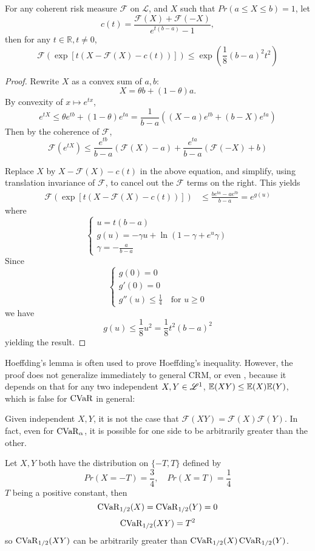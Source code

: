 \begin{prop}
For any coherent risk measure $\mathcal{F}$ on $\mathscr{L}$, and $X$ such that $Pr(a\le X \le b) = 1$, let 
$$c(t) = \frac{\mathcal{F}(X) + \mathcal{F}(-X)}{e^{t(b-a)} - 1},$$
then for any $t\in\mathbb{R}, t\neq 0$,
\begin{equation}
\label{eq:hoeffding_lemma}
\mathcal{F}(\exp{[t(X - \mathcal{F}(X) - c(t))]}) \le \exp\left(\frac 1 8 (b-a)^2 t^2\right)
\end{equation}
\end{prop}
\begin{proof}
Rewrite $X$ as a convex sum of $a, b$:
$$X = \theta b + (1-\theta) a.$$
By convexity of $x\mapsto e^{tx}$, 
$$e^{tX} \le \theta e^{tb} + (1-\theta)e^{ta} = \frac{1}{b-a}((X-a)e^{tb} + (b-X)e^{ta})$$
Then by the coherence of $\mathcal{F}$, 
$$\mathcal{F}(e^{tX}) \le \frac{e^{tb}}{b-a}(\mathcal{F}(X) -a ) + \frac{e^{ta}}{b-a}(\mathcal{F}(-X) + b)$$

Replace $X$ by $X - \mathcal{F}(X) - c(t)$ in the above equation, and simplify, using translation invariance of $\mathcal{F}$, to cancel out the $\mathcal{F}$ terms on the right. This yields
\begin{align*}
\mathcal{F}(\exp{[t(X - \mathcal{F}(X) - c(t))]}) &\le \frac{be^{ta}-a e^{tb}}{b-a} = e^{g(u)}
\end{align*}
where 
$$
\begin{cases}
u = t(b-a)\\
g(u) = -\gamma u + \ln(1-\gamma + e^u \gamma)\\
\gamma = -\frac{a}{b-a}
\end{cases}
$$
Since $$
\begin{cases}
g(0) = 0\\
g'(0) = 0\\
g''(u) \le \frac 1 4 \quad \text{for } u\ge 0
\end{cases}
$$
we have
$$g(u) \le \frac 1 8 u^2 = \frac 1 8 t^2(b-a)^2$$
yielding the result.
\end{proof}

Hoeffding's lemma is often used to prove Hoeffding's inequality. However, the proof does not generalize immediately to general CRM, or even \cvar, because it depends on that for any two independent $X, Y\in \mathscr{L}^1$, $\mathbb{E}(XY) \le \mathbb{E}(X)\mathbb{E}(Y)$, which is false for $\operatorname{CVaR}$ in general:

\begin{ex}
	Given independent $X, Y$, it is not the case that $\mathcal{F}(XY) = \mathcal{F}(X) \mathcal{F}(Y)$. In fact, even for $\operatorname{CVaR}_\alpha$, it is possible for one side to be arbitrarily greater than the other.
	
	Let $X, Y$ both have the distribution on $\{-T, T\}$ defined by 
	$$Pr(X = -T) = \frac 3 4, \quad Pr(X = T) = \frac 1 4$$ 
	$T$ being a positive constant, then 
	$$\operatorname{CVaR}_{1/2}(X) = \operatorname{CVaR}_{1/2}(Y) = 0 $$
	$$\operatorname{CVaR}_{1/2}(XY) = T^2$$
	so $\operatorname{CVaR}_{1/2}(XY)$ can be arbitrarily greater than $\operatorname{CVaR}_{1/2}(X)\operatorname{CVaR}_{1/2}(Y)$.
\end{ex}

